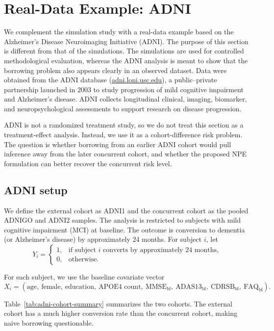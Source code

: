 \section{Real-Data Example: ADNI}
\label{sec:adni}

We complement the simulation study with a real-data example based on the
Alzheimer's Disease Neuroimaging Initiative (ADNI). The purpose of this section
is different from that of the simulations. The simulations are used for
controlled methodological evaluation, whereas the ADNI analysis is meant to
show that the borrowing problem also appears clearly in an observed dataset.
Data were obtained from the ADNI database (\url{adni.loni.usc.edu}), a
public--private partnership launched in 2003 to study progression of mild
cognitive impairment and Alzheimer's disease. ADNI collects longitudinal
clinical, imaging, biomarker, and neuropsychological assessments to support
research on disease progression.

ADNI is not a randomized treatment study, so we do not treat this section as a
treatment-effect analysis. Instead, we use it as a cohort-difference risk
problem. The question is whether borrowing from an earlier ADNI cohort would
pull inference away from the later concurrent cohort, and whether the proposed
NPE formulation can better recover the concurrent risk level.

\subsection{ADNI setup}

We define the external cohort as ADNI1 and the concurrent cohort as the pooled
ADNIGO and ADNI2 samples. The analysis is restricted to subjects with mild
cognitive impairment (MCI) at baseline. The outcome is conversion to dementia
(or Alzheimer's disease) by approximately 24 months. For subject $i$, let
\[
Y_i =
\begin{cases}
1, & \text{if subject } i \text{ converts by approximately 24 months},\\
0, & \text{otherwise.}
\end{cases}
\]

For each subject, we use the baseline covariate vector
\[
X_i = (\text{age},\ \text{female},\ \text{education},\ \text{APOE4 count},\
\text{MMSE}_{\mathrm{bl}},\ \text{ADAS13}_{\mathrm{bl}},\
\text{CDRSB}_{\mathrm{bl}},\ \text{FAQ}_{\mathrm{bl}}).
\]

Table~\ref{tab:adni-cohort-summary} summarizes the two cohorts. The external
cohort has a much higher conversion rate than the concurrent cohort, making
naive borrowing questionable.

